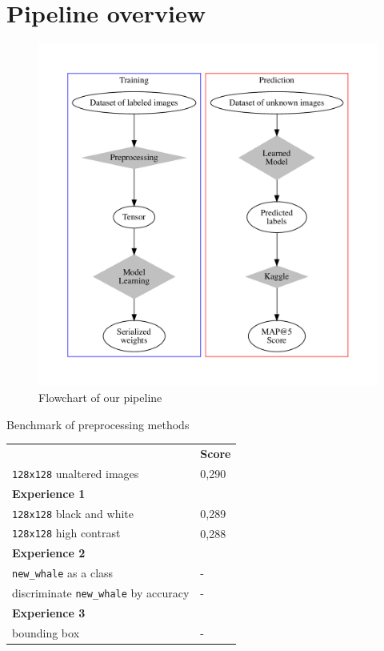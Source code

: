 \section{Pipeline overview}
\begin{frame}[c]
    \begin{figure}
        \includegraphics[width=0.75\linewidth]{flowchart.pdf}
        \caption{Flowchart of our pipeline}
    \end{figure}
\end{frame}

\begin{frame}[c]{Benchmark of preprocessing methods}
    \begin{table}[]
    \begin{tabular}{ll}
                                                 & \textbf{Score}\\
    \texttt{128x128} unaltered images            & 0,290 \\
    \textbf{Experience 1}                        &       \\
    \texttt{128x128} black and white             & 0,289 \\
    \texttt{128x128} high contrast               & 0,288 \\
    \textbf{Experience 2}                        &       \\
    \texttt{new\_whale} as a class               & -     \\
    discriminate \texttt{new\_whale} by accuracy & -     \\
    \textbf{Experience 3}                        &       \\
    bounding box                                 & -
    \end{tabular}
    \end{table}
\end{frame}


